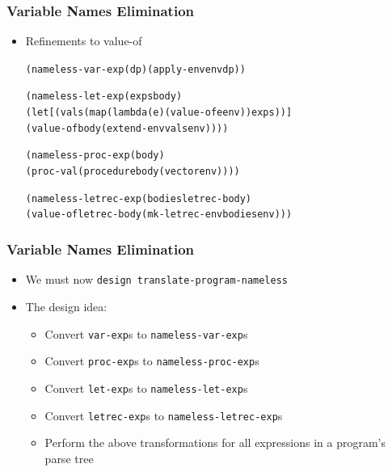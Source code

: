 \documentclass{beamer}
\begin{document}
\begin{frame}[fragile]
\frametitle{Variable Names Elimination}
\begin{scriptsize}
\begin{itemize}
\item<1-> Refinements to value-of
\begin{alltt}
(nameless-var-exp (d p) (apply-env env d p))

(nameless-let-exp (exps body)
  (let [(vals (map (lambda (e) (value-of e env)) exps))]
    (value-of body (extend-env vals env))))

(nameless-proc-exp (body)
  (proc-val (procedure body (vector env))))

(nameless-letrec-exp (bodies letrec-body)
  (value-of letrec-body (mk-letrec-env bodies env)))
\end{alltt}

\end{itemize}
\end{scriptsize}
\end{frame}

\begin{frame}[fragile]
\frametitle{Variable Names Elimination}
\begin{scriptsize}
\begin{itemize}
\item<1-> We must now \texttt{design translate-program-nameless}

\item<1-> The design idea:
\begin{itemize}
\item Convert \texttt{var-exp}s to \texttt{nameless-var-exp}s

\item Convert \texttt{proc-exp}s to \texttt{nameless-proc-exp}s

\item Convert \texttt{let-exp}s to \texttt{nameless-let-exp}s

\item Convert \texttt{letrec-exp}s to \texttt{nameless-letrec-exp}s

\item Perform the above transformations for all expressions in a program's parse tree
\end{itemize}

\end{itemize}
\end{scriptsize}
\end{frame}
\end{document}
